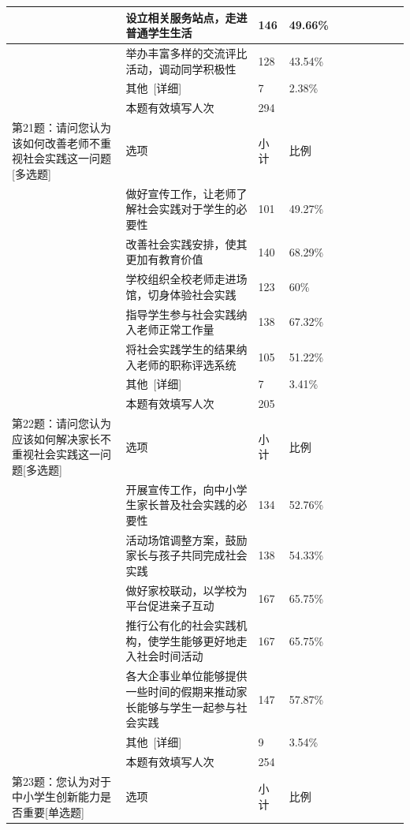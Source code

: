 \documentclass[12pt,UTF8]{ctexart}
\begin{document}
{\begin{spacing}{01}
\begin{longtable}{p{3.5cm}p{2cm}p{1.5cm}p{1.5cm}p{1.5cm}p{1.5cm}p{1.5cm}p{1cm}}
			~ & 设立相关服务站点，走进普通学生生活 & 146 & 49.66\% & ~ & ~ & ~ & ~ \\ \hline
			~ & 举办丰富多样的交流评比活动，调动同学积极性 & 128 & 43.54\% & ~ & ~ & ~ & ~ \\ \hline
			~ & 其他 [详细] & 7 & 2.38\% & ~ & ~ & ~ & ~ \\ \hline
			~ & 本题有效填写人次 & 294 & ~ & ~ & ~ & ~ & ~ \\ \hline
			第21题：请问您认为该如何改善老师不重视社会实践这一问题[多选题] & 选项 & 小计 & 比例 & ~ & ~ & ~ & ~ \\ \hline
			~ & 做好宣传工作，让老师了解社会实践对于学生的必要性 & 101 & 49.27\% & ~ & ~ & ~ & ~ \\ \hline
			~ & 改善社会实践安排，使其更加有教育价值 & 140 & 68.29\% & ~ & ~ & ~ & ~ \\ \hline
			~ & 学校组织全校老师走进场馆，切身体验社会实践 & 123 & 60\% & ~ & ~ & ~ & ~ \\ \hline
			~ & 指导学生参与社会实践纳入老师正常工作量 & 138 & 67.32\% & ~ & ~ & ~ & ~ \\ \hline
			~ & 将社会实践学生的结果纳入老师的职称评选系统 & 105 & 51.22\% & ~ & ~ & ~ & ~ \\ \hline
			~ & 其他 [详细] & 7 & 3.41\% & ~ & ~ & ~ & ~ \\ \hline
			~ & 本题有效填写人次 & 205 & ~ & ~ & ~ & ~ & ~ \\ \hline
			第22题：请问您认为应该如何解决家长不重视社会实践这一问题[多选题] & 选项 & 小计 & 比例 & ~ & ~ & ~ & ~ \\ \hline
			~ & 开展宣传工作，向中小学生家长普及社会实践的必要性 & 134 & 52.76\% & ~ & ~ & ~ & ~ \\ \hline
			~ & 活动场馆调整方案，鼓励家长与孩子共同完成社会实践 & 138 & 54.33\% & ~ & ~ & ~ & ~ \\ \hline
			~ & 做好家校联动，以学校为平台促进亲子互动 & 167 & 65.75\% & ~ & ~ & ~ & ~ \\ \hline
			~ & 推行公有化的社会实践机构，使学生能够更好地走入社会时间活动 & 167 & 65.75\% & ~ & ~ & ~ & ~ \\ \hline
			~ & 各大企事业单位能够提供一些时间的假期来推动家长能够与学生一起参与社会实践 & 147 & 57.87\% & ~ & ~ & ~ & ~ \\
			\hline
			~ & 其他 [详细] & 9 & 3.54\% & ~ & ~ & ~ & ~ \\ \hline
			~ & 本题有效填写人次 & 254 & ~ & ~ & ~ & ~ & ~ \\ \hline
			第23题：您认为对于中小学生创新能力是否重要[单选题] & 选项 & 小计 & 比例 & ~ & ~ & ~ & ~ \\ \hline

\end{longtable}
\end{spacing}}
\end{document}
